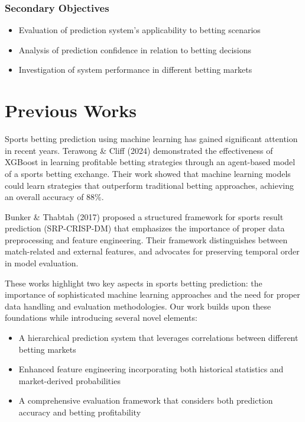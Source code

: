\documentclass[conference]{IEEEtran}
\begin{document}
\subsubsection{Secondary Objectives}
\begin{itemize}
\item Evaluation of prediction system's applicability to betting scenarios
\item Analysis of prediction confidence in relation to betting decisions
\item Investigation of system performance in different betting markets
\end{itemize}

\section{Previous Works}
Sports betting prediction using machine learning has gained significant attention in recent years. Terawong \& Cliff (2024) demonstrated the effectiveness of XGBoost in learning profitable betting strategies through an agent-based model of a sports betting exchange. Their work showed that machine learning models could learn strategies that outperform traditional betting approaches, achieving an overall accuracy of 88\%.

Bunker \& Thabtah (2017) proposed a structured framework for sports result prediction (SRP-CRISP-DM) that emphasizes the importance of proper data preprocessing and feature engineering. Their framework distinguishes between match-related and external features, and advocates for preserving temporal order in model evaluation.

These works highlight two key aspects in sports betting prediction: the importance of sophisticated machine learning approaches and the need for proper data handling and evaluation methodologies. Our work builds upon these foundations while introducing several novel elements:

\begin{itemize}
    \item A hierarchical prediction system that leverages correlations between different betting markets
    \item Enhanced feature engineering incorporating both historical statistics and market-derived probabilities
    \item A comprehensive evaluation framework that considers both prediction accuracy and betting profitability
\end{itemize}
\end{document}
